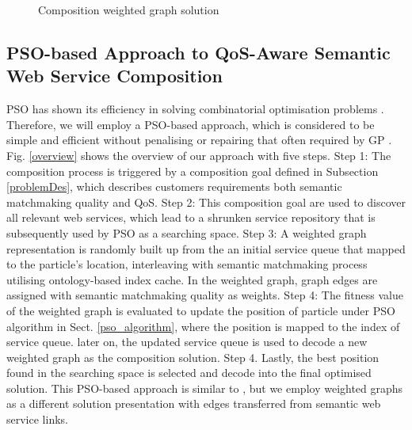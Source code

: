 \documentclass{IEEEtran}
\begin{document}
\begin{figure}[h]
\centering
{}
 \caption{Composition weighted graph solution}
 \label{wscs}
\end{figure}

\subsection{PSO-based Approach to QoS-Aware Semantic Web Service Composition}

PSO has shown its efficiency in solving combinatorial optimisation problems \cite{fukuyama2008fundamentals}. Therefore, we will employ a PSO-based approach, which is considered to be simple and efficient without penalising or repairing that often required by GP \cite{da2016particle}. Fig. \ref{overview} shows the overview of our approach with five steps. Step 1: The composition process is triggered by a composition goal defined in Subsection \ref{problemDes}, which describes customers requirements both semantic matchmaking quality and QoS. Step 2: This composition goal are used to discover all relevant web services, which lead to a shrunken service repository that is subsequently used by PSO as a searching space. Step 3: A weighted graph representation is randomly built up from the an initial service queue that mapped to the particle's location, interleaving with semantic matchmaking process utilising ontology-based index cache. In the weighted graph, graph edges are assigned with semantic matchmaking quality as weights. Step 4: The fitness value of the weighted graph is evaluated to update the position of particle under PSO algorithm in Sect. \ref{pso_algorithm}, where the position is mapped to the index of service queue. later on, the updated service queue is used to decode a new weighted graph as the composition solution. Step 4. Lastly, the best position found in the searching space is selected and decode into the final optimised solution. This PSO-based approach is similar to \cite{da2016particle}, but we employ weighted graphs as a different solution presentation with edges transferred from semantic web service links.
\end{document}
